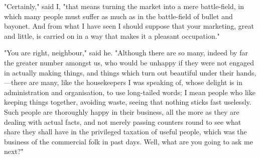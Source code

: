 "Certainly," said I, "that means turning the market into a mere
battle-field, in which many people must suffer as much as in the
battle-field of bullet and bayonet. And from what I have seen I should
suppose that your marketing, great and little, is carried on in a way
that makes it a pleasant occupation."

"You are right, neighbour," said he. "Although there are so many, indeed
by far the greater number amongst us, who would be unhappy if they were
not engaged in actually making things, and things which turn out
beautiful under their hands,---there are many, like the housekeepers I
was speaking of, whose delight is in administration and organisation, to
use long-tailed words; I mean people who like keeping things together,
avoiding waste, seeing that nothing sticks fast uselessly. Such people
are thoroughly happy in their business, all the more as they are dealing
with actual facts, and not merely passing counters round to see what
share they shall have in the privileged taxation of useful people, which
was the business of the commercial folk in past days. Well, what are you
going to ask me next?"
